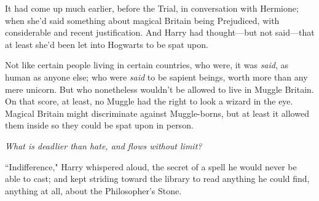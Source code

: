 It had come up much earlier, before the Trial, in conversation with Hermione; when she'd said something about magical Britain being Prejudiced, with considerable and recent justification. And Harry had thought—but not said—that at least she'd been let into Hogwarts to be spat upon.

Not like certain people living in certain countries, who were, it was \emph{said}, as human as anyone else; who were \emph{said} to be sapient beings, worth more than any mere unicorn. But who nonetheless wouldn't be allowed to live in Muggle Britain. On that score, at least, no Muggle had the right to look a wizard in the eye. Magical Britain might discriminate against Muggle-borns, but at least it allowed them inside so they could be spat upon in person.

\emph{What is deadlier than hate, and flows without limit?}

``Indifference," Harry whispered aloud, the secret of a spell he would never be able to cast; and kept striding toward the library to read anything he could find, anything at all, about the Philosopher's Stone.

